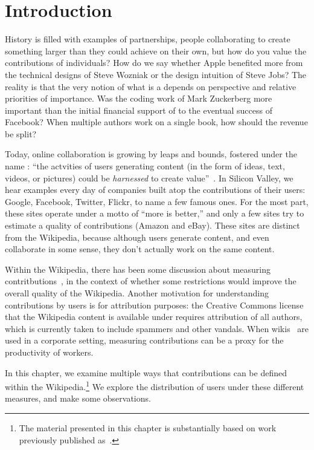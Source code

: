 
\section{Introduction}

History is filled with examples of partnerships, people collaborating
to create something larger than they could achieve on their own,
but how do you value the contributions of individuals?
How do we say whether Apple benefited more from the technical
designs of Steve Wozniak or the design intuition of Steve Jobs?
The reality is that the very notion of what is a 
depends on perspective and relative priorities of importance.
Was the coding work of Mark Zuckerberg more important than
the initial financial support of  to the eventual
success of Facebook?  
When multiple authors work on a single book, how should the
revenue be split?

Today, online collaboration is growing by leaps and bounds,
fostered under the name : ``the actvities of
users generating content (in the form of ideas, text,
videos, or pictures) could be \textit{harnessed} to
create value''~\cite{wiki:Web20}.
In Silicon Valley, we hear examples every day of companies
built atop the contributions of their users:
Google, Facebook, Twitter, Flickr, to name a few famous ones.
For the most part, these sites operate under a motto
of ``more is better,'' and only a few sites try to estimate
a quality of contributions (\eg Amazon and eBay).
These sites are distinct from the Wikipedia, because although
users generate content, and even collaborate in some sense,
they don't actually work on the same content.

Within the Wikipedia, there has been some discussion
about measuring contritbutions~\cite{Wales2005,Swartz2006},
in the context of whether some restrictions would improve
the overall quality of the Wikipedia.
Another motivation for understanding contributions by
users is for attribution purposes: the Creative Commons license
that the Wikipedia content is available under requires attribution
of all authors, which is currently taken to include spammers
and other vandals.
When wikis~\cite{Leuf2001} are used in a corporate setting,
measuring contributions can be a proxy for the productivity
of workers.

In this chapter, we examine multiple ways that contributions
can be defined within the Wikipedia.\footnote{The material
presented in this chapter is substantially based on work
previously published as~\cite{Adler2008a}.}
We explore the distribution of users under these different measures,
and make some observations.

